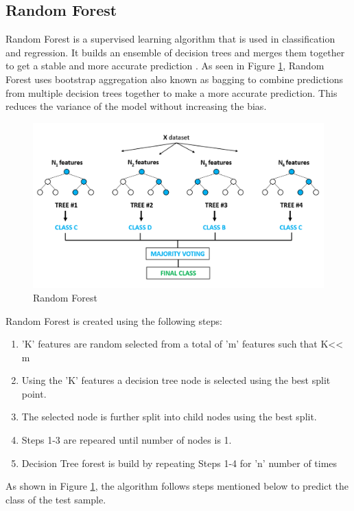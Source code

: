\subsection{Random Forest}

Random Forest is a supervised learning algorithm that is used in classification and regression. It builds an ensemble of decision trees and merges them together to get a stable and more accurate prediction \cite{Tin95}. As seen in Figure \ref{fig:random_forest}, Random Forest uses bootstrap aggregation also known as bagging to combine predictions from multiple decision trees together to make a more accurate prediction. This reduces the variance of the model without increasing the bias.

\begin{figure}[htb]
	\centering
	\includegraphics[width=1\textwidth]{images/random_forest.png}
	\caption{Random Forest} 
	\label{fig:random_forest}
\end{figure}

Random Forest is created using the following steps:
\begin{enumerate}
	\item 'K' features are random selected from a total of 'm' features such that K<< m
	\item Using the 'K' features a decision tree node is selected using the best split point.
	\item The selected node is further split into child nodes using the best split.
	\item Steps 1-3 are repeared until number of nodes is 1.
	\item Decision Tree forest is build by repeating Steps 1-4 for 'n' number of times 
\end{enumerate}

As shown in Figure \ref{fig:random_forest}, the algorithm follows steps mentioned below to predict the class of the test sample.

